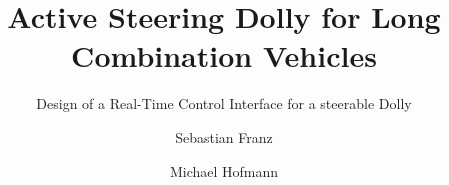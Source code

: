 \documentclass[masters,a4paper]{chalmers-thesis}
\title{Active Steering Dolly for Long Combination Vehicles}
\subtitle{Design of a Real-Time Control Interface for a steerable Dolly} %
\author{Sebastian Franz\and Michael Hofmann}
\begin{document}
\maketitle

















\clearpage
\nocite{*} %
\printbibliography %
%
%
%
\end{document}
